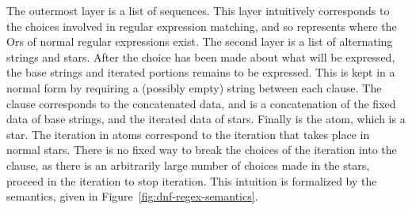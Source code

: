 The outermost layer is a list of sequences.
This layer intuitively corresponds to the choices involved in regular expression matching, and so represents where the Ors of normal regular expressions exist.
The second layer is a list of alternating strings and stars.
After the choice has been made about what will be expressed,
the base strings and iterated portions remains to be expressed.
This is kept in a normal form by requiring a (possibly empty) string between
each clause.
The clause corresponds to the concatenated data, and is a concatenation of the
fixed data of base strings, and the iterated data of stars.
Finally is the atom, which is a star.
The iteration in atoms correspond to the iteration that takes place in normal stars.
There is no fixed way to break the choices of the iteration into the clause,
as there is an arbitrarily large number of choices made in the stars, proceed
in the iteration to stop iteration.
This intuition is formalized by the semantics, given in
Figure~\ref{fig:dnf-regex-semantics}.

